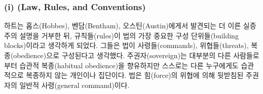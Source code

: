 \subsubsection{\texorpdfstring{(i)  (Law, Rules,
and
Conventions)}{(i) 법, 규칙, 관행 (Law, Rules, and Conventions)}}\label{i-uxbc95-uxaddcuxce59-uxad00uxd589-law-rules-and-conventions}

하트는 홉스(Hobbes), 벤담(Bentham), 오스틴(Austin)에게서 발견되는 더
이른 실증주의 설명을 거부한 뒤, 규칙들(rules)이 법의 가장 중요한 구성
단위들(building blocks)이라고 생각하게 되었다. 그들은 법이
사령들(commands), 위협들(threats), 복종(obedience)으로 구성된다고
생각했다. 주권자(sovereign)는 대부분의 다른 사람들로부터 습관적
복종(habitual obedience)을 향유하지만 스스로는 다른 누구에게도
습관적으로 복종하지 않는 개인이나 집단이다. 법은 힘(force)의 위협에 의해
뒷받침된 주권자의 일반적 사령(general command)이다.

